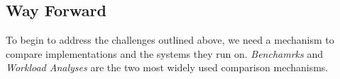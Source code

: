 
\subsection{\gai Way Forward}
To begin to address the challenges outlined above, we need a mechanism to compare \gai implementations and the systems they run on.
\textit{Benchamrks} and \textit{Workload Analyses} are the two most widely used comparison mechanisms. 

